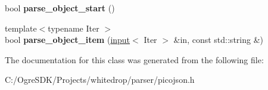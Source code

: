 \begin{DoxyCompactItemize}
\item 
\hypertarget{classpicojson_1_1null__parse__context_a95c208456592c33d53548fa88b831c7c}{bool {\bfseries parse\+\_\+object\+\_\+start} ()}\label{classpicojson_1_1null__parse__context_a95c208456592c33d53548fa88b831c7c}

\item 
\hypertarget{classpicojson_1_1null__parse__context_a97c4b81a984ea473fe56e09aed7b9ca6}{{\footnotesize template$<$typename Iter $>$ }\\bool {\bfseries parse\+\_\+object\+\_\+item} (\hyperlink{classpicojson_1_1input}{input}$<$ Iter $>$ \&in, const std\+::string \&)}\label{classpicojson_1_1null__parse__context_a97c4b81a984ea473fe56e09aed7b9ca6}

\end{DoxyCompactItemize}


The documentation for this class was generated from the following file\+:\begin{DoxyCompactItemize}
\item 
C\+:/\+Ogre\+S\+D\+K/\+Projects/whitedrop/parser/picojson.\+h\end{DoxyCompactItemize}
